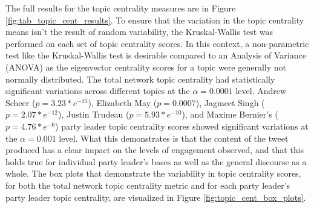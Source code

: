 The full results for the topic centrality measures are in Figure
\ref{fig:tab_topic_cent_results}. To ensure that the variation in the topic
centrality means isn't the result of random variability, the Kruskal-Wallis test
was performed on each set of topic centrality scores. In this context, a
non-parametric test like the Kruskal-Wallis test is desirable compared to an
Analysis of Variance (ANOVA) as the eigenvector centrality scores for a topic
were generally not normally distributed. The total network topic centrality had
statistically significant variations across different topics at the
$\alpha=0.0001$ level. Andrew Scheer ($p=3.23*e^{-15}$), Elizabeth May
($p=0.0007$), Jagmeet Singh ($p=2.07*e^{-12}$), Justin Trudeau
($p=5.93*e^{-10}$), and Maxime Bernier's ($p=4.76*e^{-6}$) party leader topic
centrality scores showed significant variations at the $\alpha=0.001$ level.
What this demonstrates is that the content of the tweet produced has a clear
impact on the levels of engagement observed, and that this holds true for
individual party leader's bases as well as the general discourse as a whole. The
box plots that demonstrate the variability in topic centrality scores, for both
the total network topic centrality metric and for each party leader's party
leader topic centrality, are visualized in Figure
\ref{fig:topic_cent_box_plots}.

